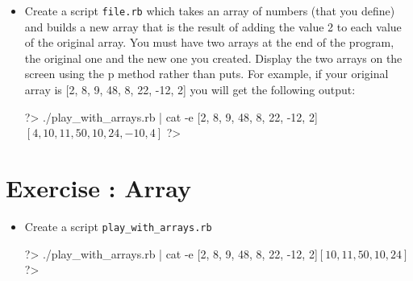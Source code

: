 \documentclass{42-en}
\begin{document}
\exnumber{\exercicenumber}

\makeheaderfiles

\begin{itemize}

\item Create a script \texttt{file.rb} which takes an array of numbers (that you define) and builds a new array that is the result of adding the value 2 to each value of the original array. You must have two arrays at the end of the program, the original one and the new one you created. Display the two arrays on the screen using the p method rather than puts. 
For example, if your original array is [2, 8, 9, 48, 8, 22, -12, 2] you will get the following output:

\begin{42console}
	?> ./play_with_arrays.rb | cat -e
	[2, 8, 9, 48, 8, 22, -12, 2]$
	[4, 10, 11, 50, 10, 24, -10, 4]$
	?>
\end{42console}

\end{itemize}



\chapter{Exercise \exercicenumber: Array\+\+}

\exnumber{\exercicenumber}

\makeheaderfiles

\begin{itemize}

\item Create a script \texttt{play_with_arrays.rb} 

\begin{42console}
	?> ./play_with_arrays.rb | cat -e
	[2, 8, 9, 48, 8, 22, -12, 2]$
	[10, 11, 50, 10, 24]$
	?>
\end{42console}

\end{itemize}
\end{document}
